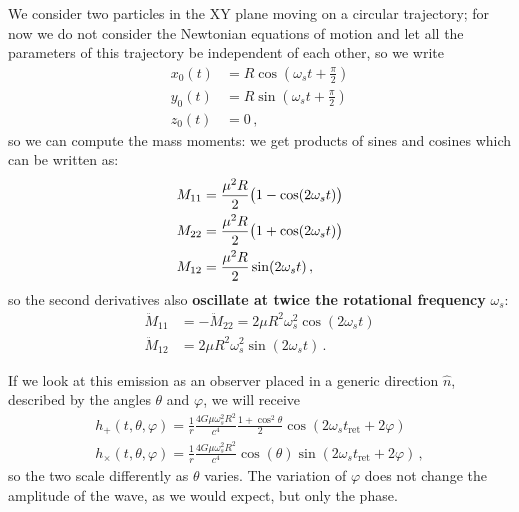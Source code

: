 \documentclass[main.tex]{subfiles}
\begin{document}
We consider two particles in the XY plane moving on a circular trajectory; for now we do not consider the Newtonian equations of motion and let all the parameters of this trajectory be independent of each other, so we write 
%
\begin{subequations}
\begin{align}
x_0 (t) &= R \cos(\omega_{s} t + \frac{\pi}{2}) \\
y_0 (t) &= R \sin(\omega_{s} t + \frac{\pi}{2}) \\
z_0 (t) &= 0
\,,
\end{align}
\end{subequations}
%
so we can compute the mass moments: we get products of sines and cosines which can be written as:
%
\begin{align}
M_{11} &= \frac{\mu^2R}{2} \qty(1 - \cos(2 \omega_{s}t)) \\
M_{22} &= \frac{\mu^2R}{2} \qty(1 + \cos(2 \omega_{s}t)) \\
M_{12} &= \frac{\mu^2R}{2} \sin(2 \omega_{s}t) 
\,,
\end{align}
%
so the second derivatives also \textbf{oscillate at twice the rotational frequency} \(\omega_{s}\):
%
\begin{subequations} \label{eq:second-mass-moment-xy-components}
\begin{align}
\ddot{M}_{11} &= - \ddot{M}_{22} = 2 \mu R^2 \omega_{s}^2 \cos(2 \omega_{s}t)  \\
\ddot{M}_{12} &= 2 \mu R^2\omega_{s}^2  \sin( 2 \omega_{s}t)
\,.
\end{align}
\end{subequations}

If we look at this emission as an observer placed in a generic direction \(\hat{n}\), described by the angles \(\theta \) and \(\varphi \), we will receive 
%
\begin{subequations}
\begin{align}
h_{+} (t, \theta , \varphi ) = \frac{1}{r} \frac{4G \mu \omega_{s}^2 R^2}{c^{4}} \frac{1 + \cos^2\theta }{2} \cos(2 \omega_{s}t _{\text{ret}} + 2 \varphi  ) \\
h_{ \times } (t, \theta , \varphi ) = \frac{1}{r} \frac{4G \mu \omega_{s}^2 R^2}{c^{4}} \cos(\theta ) \sin(2 \omega_{s}t _{\text{ret}} + 2 \varphi  )
\,,
\end{align}
\end{subequations}
%
so the two scale differently as \(\theta \) varies.
The variation of \(\varphi \) does not change the amplitude of the wave, as we would expect, but only the phase.
\end{document}
